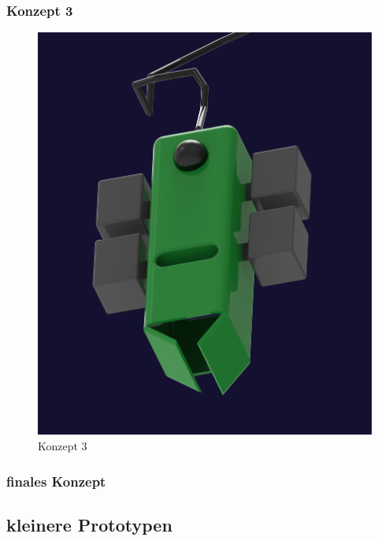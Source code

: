 \documentclass[11pt]{article}
\begin{document}
\subsubsection{Konzept 3}
\begingroup
\begin{figure}
\centering
  {\setlength{\belowcaptionskip}{-10pt}
    \includegraphics[width=\linewidth]{Konzept-3.jpg}
    \caption{Konzept 3}
  }
\end{figure}
\KonteptDrei

\endgroup
\subsubsection{finales Konzept}
\KonteptFinal

\newpage
\subsection{kleinere Prototypen}
\kleinePrototypen
\end{document}
